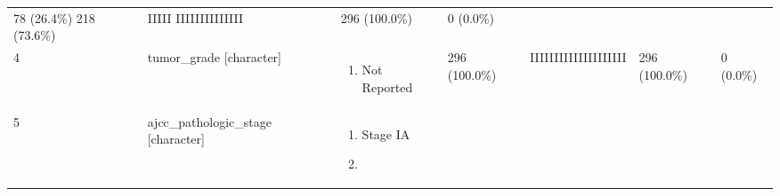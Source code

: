 \documentclass[
]{article}
\providecommand{\tightlist}{%
  \setlength{\itemsep}{0pt}\setlength{\parskip}{0pt}}
\begin{document}
\begin{longtable}[]{@{}lllllll@{}}
\begin{minipage}[t]{0.14\columnwidth}
78 (26.4\%)
218 (73.6\%)\strut
\end{minipage} & \begin{minipage}[t]{0.15\columnwidth}\raggedright
IIIII
IIIIIIIIIIIIII\strut
\end{minipage} & \begin{minipage}[t]{0.07\columnwidth}\raggedright
296
(100.0\%)\strut
\end{minipage} & \begin{minipage}[t]{0.07\columnwidth}\raggedright
0
(0.0\%)\strut
\end{minipage}\tabularnewline
\begin{minipage}[t]{0.03\columnwidth}\raggedright
4\strut
\end{minipage} & \begin{minipage}[t]{0.17\columnwidth}\raggedright
tumor\_grade
{[}character{]}\strut
\end{minipage} & \begin{minipage}[t]{0.17\columnwidth}\raggedright
\begin{enumerate}
\def\labelenumi{\arabic{enumi}.}
\tightlist
\item
  Not Reported
\end{enumerate}\strut
\end{minipage} & \begin{minipage}[t]{0.14\columnwidth}\raggedright
296 (100.0\%)\strut
\end{minipage} & \begin{minipage}[t]{0.15\columnwidth}\raggedright
IIIIIIIIIIIIIIIIIIII\strut
\end{minipage} & \begin{minipage}[t]{0.07\columnwidth}\raggedright
296
(100.0\%)\strut
\end{minipage} & \begin{minipage}[t]{0.07\columnwidth}\raggedright
0
(0.0\%)\strut
\end{minipage}\tabularnewline
\begin{minipage}[t]{0.03\columnwidth}\raggedright
5\strut
\end{minipage} & \begin{minipage}[t]{0.17\columnwidth}\raggedright
ajcc\_pathologic\_stage
{[}character{]}\strut
\end{minipage} & \begin{minipage}[t]{0.17\columnwidth}\raggedright
\begin{enumerate}
\def\labelenumi{\arabic{enumi}.}
\tightlist
\item
  Stage IA
\item

\end{enumerate}
\end{minipage}
\end{longtable}
\end{document}
